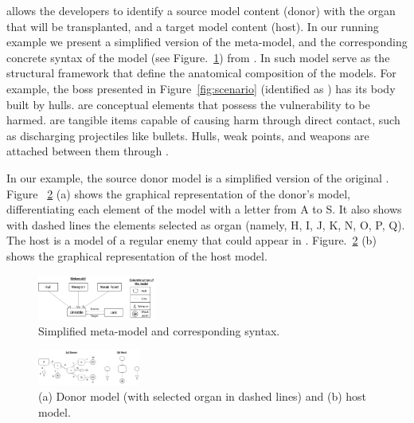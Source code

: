 \ApproachName{} allows the developers to identify a source model content (donor) with the organ that will be transplanted, and a target model content (host). 
In our running example we present a simplified version of the meta-model, and the corresponding concrete syntax of the model (see Figure.~\ref{fig:metamodel+syntax}) from  \CaseStudy{}.  In such model  serve as the structural framework that define the anatomical composition of the models. For example, the boss presented in Figure~\ref{fig:scenario} (identified as ) has its body built by hulls.  are conceptual elements that possess the vulnerability to be harmed.
 are tangible items capable of causing harm through direct contact, such as discharging projectiles like bullets. Hulls, weak points, and weapons are attached between them through .

In our example, the source donor model is a simplified version of the original \CaseStudy{}  . Figure ~\ref{fig:donor_host} (a) shows the graphical representation of the donor's model, differentiating each element of the model with a letter from A to S. It also shows with dashed lines the elements selected as organ (namely, H, I, J, K, N, O, P, Q). The host is a model of a regular enemy that could appear in \CaseStudy{}. Figure.~\ref{fig:donor_host} (b) shows the graphical representation of the host model.

\begin{figure}[tb]
	\centering
	\includegraphics[width=0.35\textwidth]{Figures/metamodel+syntax.png}
	\caption{Simplified meta-model and corresponding syntax.}
	\label{fig:metamodel+syntax}
\end{figure}

\begin{figure}[tb]
    \centering
    \includegraphics[width=0.30\textwidth]{Figures/donor+host.png}
    \caption{(a) Donor model (with selected organ in dashed lines) and (b) host model.}
    \label{fig:donor_host}
\end{figure}

